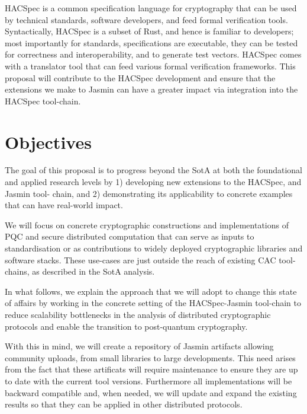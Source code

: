 \documentclass[preprint]{iacrtrans}
\begin{document}
    \par HACSpec \cite{HACS} is a common specification language for cryptography that can be used by technical standards, software developers, and feed formal verification tools. Syntactically, HACSpec is a subset of Rust, and hence is familiar to developers; most importantly for standards, specifications are executable, they can be tested for correctness and interoperability, and to generate test vectors. 
    HACSpec comes with a translator tool that can feed various formal verification frameworks.
    This proposal will contribute to the HACSpec development and ensure that the extensions we make to Jasmin can have a greater impact via integration into the HACSpec tool-chain.  


\section*{Objectives}

    \hspace{4mm} The goal of this proposal is to progress beyond the SotA at both the foundational and applied research levels by 1) developing new extensions to the HACSpec, and Jasmin tool- chain, and 2) demonstrating its applicability to concrete examples that can have real-world impact.

    \par We will focus on concrete cryptographic constructions and implementations of PQC and secure distributed computation that can serve as inputs to standardisation or as contributions to widely deployed cryptographic libraries and software stacks. These use-cases are just outside the reach of existing CAC tool-chains, as described in the SotA analysis.

    In what follows, we explain the approach that we will adopt to change this state of affairs by working in the concrete setting of the HACSpec-Jasmin tool-chain to reduce scalability bottlenecks in the analysis of distributed cryptographic protocols and enable the transition to post-quantum cryptography.

    \par With this in mind, we will create a repository of Jasmin artifacts allowing community uploads, from small libraries to large developments. This need arises from the fact that these artificats will require maintenance to ensure they are up to date with the current tool versions. Furthermore all implementations will be backward compatible and, when needed, we will update and expand the existing results so that they can be applied in other distributed protocols.
\end{document}
